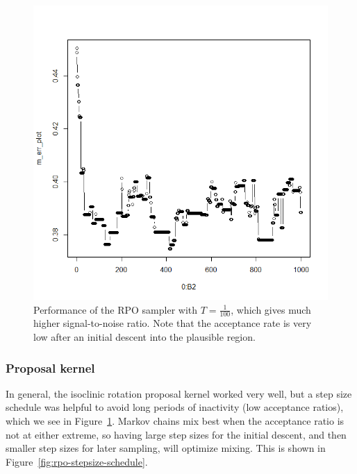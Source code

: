 \documentclass{amsart}
\begin{document}
\begin{figure}
	\begin{centering}
		\includegraphics[scale=0.3]{rpo-temperature}
		\par\end{centering}
	\caption{Performance of the RPO sampler with $T=\frac{1}{100}$, which gives much higher signal-to-noise ratio. Note that the acceptance rate is very low after an initial descent into the plausible region.}
	\label{fig:rpo-temperature}
\end{figure}

\subsubsection{Proposal kernel}

In general, the isoclinic rotation proposal kernel worked very well, but a step size schedule was helpful to avoid long periods of inactivity (low acceptance ratios), which we see in Figure~\ref{fig:rpo-temperature}. Markov chains mix best when the acceptance ratio is not at either extreme, so having large step sizes for the initial descent, and then smaller step sizes for later sampling, will optimize mixing. This is shown in Figure~\ref{fig:rpo-stepsize-schedule}.
\end{document}
